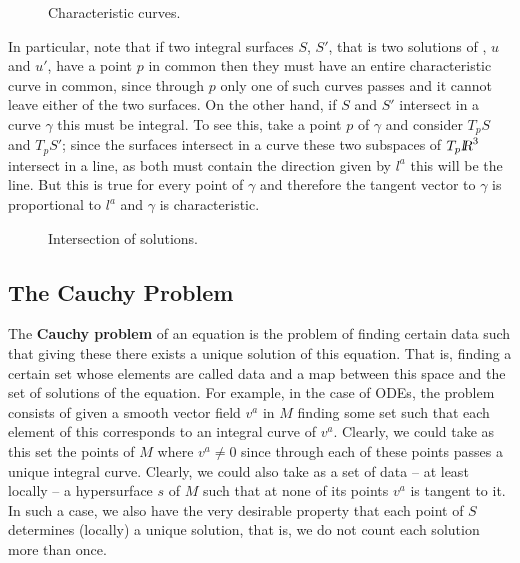 \espa 
\begin{figure}[htbp]
  \begin{center}
    \caption{Characteristic curves.}
    \label{fig:11_1}
  \end{center}
\end{figure}

In particular, note that if two integral surfaces $S$, $S'$, that is two
solutions of , $u$ and $u'$, have a point $p$ in common then they must
have an entire characteristic curve in common, since through $p$ only
one of such curves passes and it cannot leave either of the
two surfaces.
On the other hand, if $S$ and $S'$ intersect in a curve $\gamma$ this must be
integral. To see this, take a point $p$ of $\gamma$ and consider
$T_pS$ and $T_pS'$; since the surfaces intersect in a curve these two
subspaces of $T_p\mbox{\sl {l$\!\!\!\;\:\!$R}}^3$ intersect in a line, as both must
contain the direction given by $l^a$ this will be the line. But this is
true for every point of $\gamma$ and therefore the tangent vector to $\gamma$
is proportional to $l^a$ and $\gamma$ is characteristic.

\espa 
\begin{figure}[htbp]
  \begin{center}
    \caption{Intersection of solutions.}
    \label{fig:11_2}
  \end{center}
\end{figure}

\subsection{The Cauchy Problem}

The {\bf Cauchy problem} of an equation is the problem of finding
certain data such that giving these there exists a unique solution of
this equation. That is, finding a certain set 
whose elements are called data and a map between this space and the set of 
solutions of the equation. 
For example, in the case of ODEs, the problem
consists of given a smooth vector field $v^a$ in $M$ finding some
set such that each element of this corresponds to an integral curve
of $v^a$.
Clearly, we could take as this set the points of $M$
where $v^a\neq0$ since through each of these points passes a unique
integral curve. Clearly, we could also take as a set of 
data -- at least locally --
a hypersurface $s$ of $M$ such that at none of its points
$v^a$ is tangent to it. 
In such a case, we also have the very desirable
property that each point of $S$ determines (locally) a unique solution, that is, we do not count each solution more than once.

